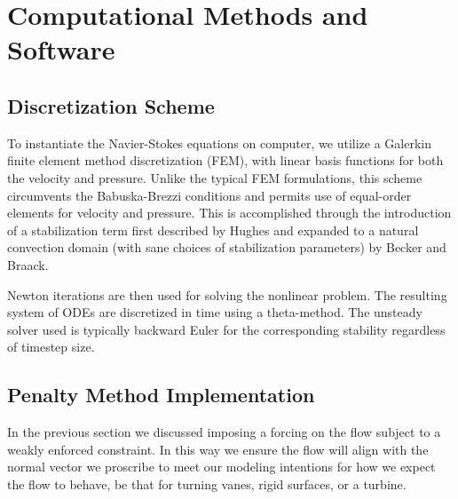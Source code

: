 \section{Computational Methods and Software}
\label{sec:software}


\subsection{Discretization Scheme}

To instantiate the Navier-Stokes equations on computer, we utilize a
Galerkin finite element method discretization (FEM), with linear basis
functions for both the velocity and pressure. Unlike the typical FEM formulations,
this scheme circumvents the Babuska-Brezzi conditions\cite{bb-cond} and
permits use of equal-order elements for velocity and 
pressure. This is accomplished through the introduction of a
stabilization term first described by Hughes\cite{Hughes198685} and
expanded to a natural convection domain (with sane choices of
stabilization parameters) by Becker and Braack\cite{Becker2002428}. 

Newton iterations are then used for solving the nonlinear problem. 
The resulting system of ODEs are discretized in time using a theta-method. 
The unsteady solver used is typically backward Euler for the corresponding
stability regardless of timestep size. 

\subsection{Penalty Method Implementation}

In the previous section we discussed imposing a forcing on 
the flow subject to a weakly enforced constraint. In this way we ensure 
the flow will align with the normal vector we proscribe to meet our
modeling intentions for how we expect the flow to behave, be that for
turning vanes, rigid surfaces, or a turbine. 

